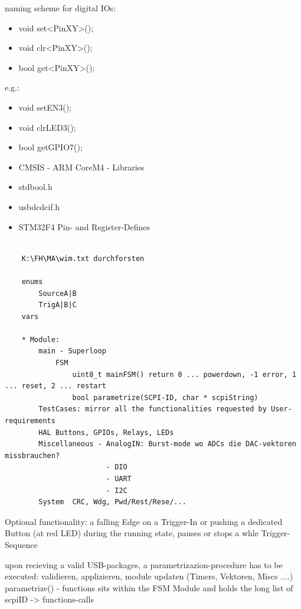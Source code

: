 	{	naming scheme for digital IOs:
		\begin{itemize} \setlength\itemsep{1px}
			\item void	set<PinXY>();
			\item void	clr<PinXY>();
			\item bool	get<PinXY>();
		\end{itemize}
		e.g.:
		\begin{itemize} \setlength\itemsep{1px}
		\item void	setEN3();
		\item void	clrLED3();
		\item bool	getGPIO7();
		\end{itemize}
	}

	{	\begin{itemize} \setlength\itemsep{1px}
		\item CMSIS - ARM CoreM4 - Libraries
		\item stdbool.h
		\item usbdcdcif.h
		\item STM32F4 Pin- and Register-Defines
		\end{itemize}
	}


\begin{verbatim}
	
	K:\FH\MA\wim.txt durchforsten
	
	enums
		SourceA|B
		TrigA|B|C
	vars
	
	* Module:
		main - Superloop
			FSM
				uint8_t mainFSM() return 0 ... powerdown, -1 error, 1 ... reset, 2 ... restart
				bool parametrize(SCPI-ID, char * scpiString)
		TestCases: mirror all the functionalities requested by User-requirements
		HAL Buttons, GPIOs, Relays, LEDs
		Miscellaneous - AnalogIN: Burst-mode wo ADCs die DAC-vektoren missbrauchen?
						- DIO
						- UART
						- I2C
		System	CRC, Wdg, Pwd/Rest/Rese/...

\end{verbatim}
	{	
	}

	{	Optional functionality: a falling Edge on a Trigger-In or pushing a dedicated Button (at red LED) during the running state, pauses or stops a whle Trigger-Sequence
	}

	{	upon recieving a valid USB-packages, a parametrizazion-procedure has to be executed:
		validieren, applizieren, module updaten (Timers, Vektoren, Miscs ....)
		parametrize() - functions sits within the FSM Module and holds the long list of scpiID -> functions-calls
	}

